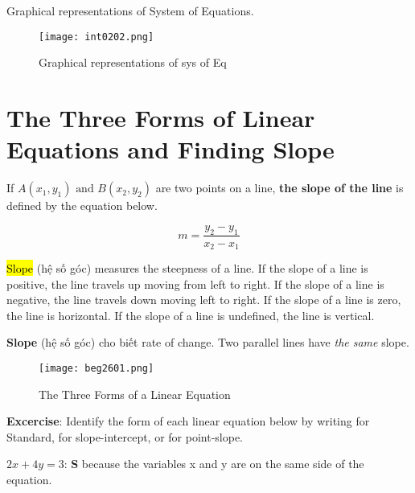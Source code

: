Graphical representations of System of Equations.

\begin{figure}[htb!]
  \centering
  \texttt{[image: int0202.png]}
  \caption{Graphical representations of sys of Eq}
\end{figure}

\newpage

\section{The Three Forms of Linear Equations and Finding Slope}




If \(A(x_{1},y_{1})\text{ and } B(x_{2},y_{2})\) are two points on a line, \textbf{the slope of the line} is defined by the equation below.

\begin{equation}
  m = \frac{y_{2}-y_{1}}{x_{2}-x_{1}}
  \label{eq:3.1}
\end{equation}

\hl{Slope} (hệ số góc) measures the steepness of a line. If the slope of a line is positive, the line travels up moving from left to right. If the slope of a line is negative, the line travels down moving left to right. If the slope of a line is zero, the line is horizontal. If the slope of a line is undefined, the line is vertical.

\textbf{Slope} (hệ số góc) cho biết rate of change. Two parallel lines have \textit{the same} slope.


\begin{figure}[htb!]
  \centering
  \texttt{[image: beg2601.png]}
  \caption{The Three Forms of a Linear Equation}
\end{figure}



\textbf{Excercise}: Identify the form of each linear equation below by writing  for Standard,  for slope-intercept, or  for point-slope.

$2x+4y=3$: \textbf{S} because the variables x and y are on the same side of the equation.

